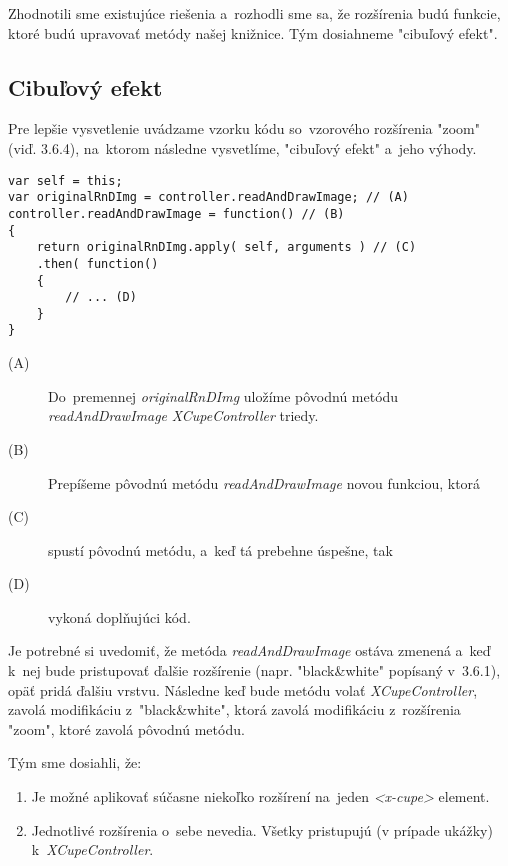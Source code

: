 Zhodnotili sme existujúce riešenia a~rozhodli sme sa, že rozšírenia budú funkcie, ktoré budú upravovať metódy našej knižnice. Tým dosiahneme "cibuľový efekt".

\subsection{Cibuľový efekt}

Pre lepšie vysvetlenie uvádzame vzorku kódu so~vzorového rozšírenia "zoom" (viď. 3.6.4), na~ktorom následne vysvetlíme, "cibuľový efekt" a~jeho výhody.

\begin{lstlisting}[label=vytvaranie-cibuloveho-efektu,caption=Vytváranie cibuľového efektu]
var self = this;
var originalRnDImg = controller.readAndDrawImage; // (A)
controller.readAndDrawImage = function() // (B)
{
    return originalRnDImg.apply( self, arguments ) // (C)
    .then( function()
    {
        // ... (D)
    }
}
\end{lstlisting}

\begin{description}
	\item [(A)] Do~premennej \emph{originalRnDImg} uložíme pôvodnú metódu \emph{readAndDrawImage} \emph{XCupeController} triedy. 
	\item [(B)] Prepíšeme pôvodnú metódu \emph{readAndDrawImage} novou funkciou, ktorá
	\item [(C)] spustí pôvodnú metódu, a~keď tá prebehne úspešne, tak
	\item [(D)] vykoná doplňujúci kód.
\end{description}

Je potrebné si uvedomiť, že metóda \emph{readAndDrawImage} ostáva zmenená a~keď k~nej bude pristupovať ďalšie rozšírenie (napr. "black\&white" popísaný v~3.6.1), opäť pridá ďalšiu vrstvu. Následne keď bude metódu volať \emph{XCupeController}, zavolá modifikáciu z~"black\&white", ktorá zavolá modifikáciu z~rozšírenia "zoom", ktoré zavolá pôvodnú metódu.


Tým sme dosiahli, že:

\begin{enumerate}
	\item Je možné aplikovať súčasne niekoľko rozšírení na~jeden \emph{<x-cupe>} element.
	\item Jednotlivé rozšírenia o~sebe nevedia. Všetky pristupujú (v prípade ukážky) k~\emph{XCupeController}. 
\end{enumerate}


